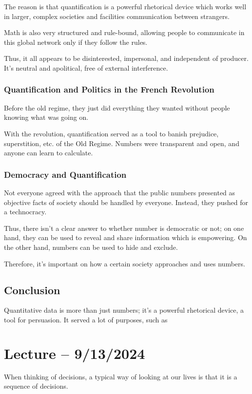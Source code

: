 \documentclass[openany]{book}
\begin{document}
The reason is that quantification is a powerful rhetorical device which works well in larger, complex societies and facilities communication between strangers.

Math is also very structured and rule-bound, allowing people to communicate in this global network only if they follow the rules.

Thus, it all appears to be disinterested, impersonal, and independent of producer. It's neutral and apolitical, free of external interference.

\subsubsection{Quantification and Politics in the French Revolution}
Before the old regime, they just did everything they wanted without people knowing what was going on.

With the revolution, quantification served as a tool to banish prejudice, superstition, etc. of the Old Regime. Numbers were transparent and open, and anyone can learn to calculate.

\subsubsection{Democracy and Quantification}
Not everyone agreed with the approach that the public numbers presented as objective facts of society should be handled by everyone. Instead, they pushed for a technocracy.

Thus, there isn't a clear answer to whether number is democratic or not; on one hand, they can be used to reveal and share information which is empowering. On the other hand, numbers can be used to hide and exclude.

Therefore, it's important on how a certain society approaches and uses numbers.

\subsection{Conclusion}
Quantitative data is more than just numbers; it's a powerful rhetorical device, a tool for persuasion. It served a lot of purposes, such as 

\section{Lecture -- 9/13/2024}
When thinking of decisions, a typical way of looking at our lives is that it is a sequence of decisions.
\end{document}
